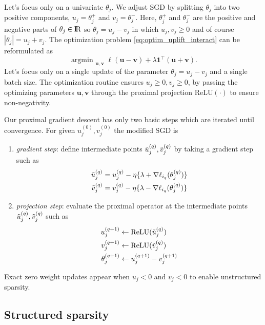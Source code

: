 \documentclass{article}
\def \real{\rm I\!R}
\DeclareMathOperator*{\argmin}{argmin~} %
\begin{document}
Let's focus only on a univariate $\theta_j$. We adjust SGD by splitting $\theta_j$ into two positive components, $u_j=\theta_j^+$ and $v_j=\theta_j^-$. Here, $\theta_j^+$ and $\theta_j^-$ are the positive and negative parts of $\theta_j \in \real$ so $\theta_j= u_j-v_j$ in which $u_j,v_j\geq 0$ and of course $|\theta_j| = u_j+v_j$. The optimization problem \eqref{eq:optim_uplift_interact}  can be reformulated as 
%
$$\argmin_{\mathbf u,\mathbf v} \ell(\mathbf u-\mathbf v ) +\lambda \mathbf 1^\top(\mathbf u+\mathbf v).$$
Let's focus only on a single update of the parameter $\theta_j=u_j-v_j$ and a single batch size. 
The optimization routine ensures $u_j\geq 0, v_j\geq 0$, by passing the optimizing parameters $\mathbf u, \mathbf v$ through the proximal projection $\mathrm{ReLU}(\cdot)$  to ensure non-negativity.  

Our proximal gradient descent has only two basic steps which are iterated until convergence. For given  $u_j^{(0)}, v_j^{(0)}$ the modified SGD is
\begin{enumerate}
    \item \emph{gradient step}: define intermediate points $\Tilde{u}_j^{(q)}, \Tilde{v}_j^{(q)}$ by taking a gradient step such as
    \begin{align}
        \Tilde{u}_j^{(q)} &= u_j^{(q)} - \eta \{ \lambda + \nabla \ell_{i_q}(\theta_j^{(q)})\}\nonumber\nonumber\\
        \Tilde{v}_j^{(q)} &= v_j^{(q)} - \eta \{ \lambda - \nabla \ell_{i_q}(\theta_j^{(q)})\} 
                \label{eq:lasso_prox_update1}
    \end{align}
%
%    
    \item \emph{projection step}: evaluate the proximal operator at the intermediate points $\Tilde{u}_j^{(q)}, \Tilde{v}_j^{(q)}$ such as
%   
    \begin{align}
        u_j^{(q+1)} &\leftarrow \mathrm{ReLU}(\Tilde{u}_j^{(q)})\nonumber\\
        v_j^{(q+1)} &\leftarrow \mathrm{ReLU}(\Tilde{v}_j^{(q)})\nonumber\\
        \theta_j^{(q+1)} &\leftarrow u_j^{(q+1)} - v_j^{(q+1)}  
        \label{eq:lasso_prox_update2}
    \end{align}
\end{enumerate}
Exact zero weight updates appear when  $u_j<0$ and $v_j<0$ to enable unstructured sparsity. 

\subsection{Structured sparsity}
\end{document}
